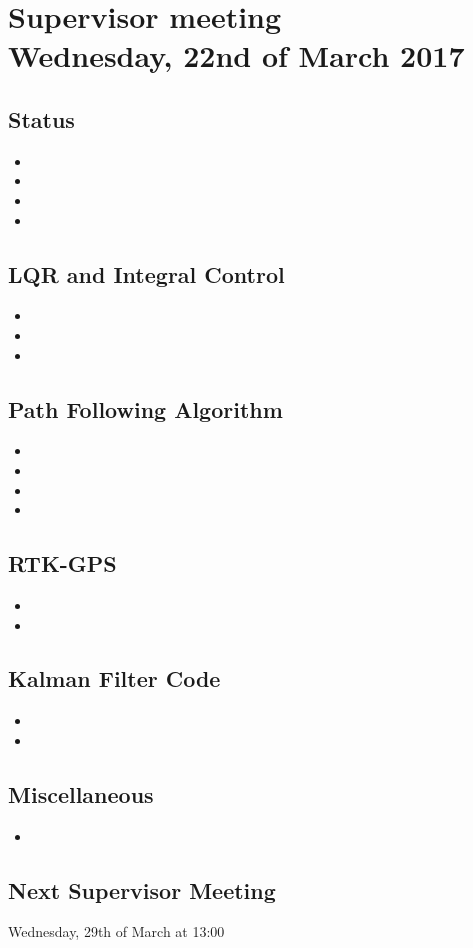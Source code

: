
\renewcommand{\vec}[1]{\boldsymbol{\mathbf{#1}}}

\renewcommand\chaptername{KAPITEL}
\renewcommand\contentsname{Indhold}
\renewcommand\figurename{Figur}
\renewcommand\tablename{Tabel}

\section*{Supervisor meeting\\ \small Wednesday, 22nd of March 2017}
\subsection{Status}
\begin{itemize}
	\item 
	\item
	\item
	\item
\end{itemize}	
\subsection{LQR and Integral Control}
\begin{itemize}
	\item 
	\item 
	\item 
\end{itemize}	
\subsection{Path Following Algorithm}
\begin{itemize}
	\item 
	\item  
	\item 
	\item 
\end{itemize}
\subsection{RTK-GPS}
\begin{itemize}
	\item 
	\item 
\end{itemize}
\subsection{Kalman Filter Code}
\begin{itemize}
	\item 
	\item 
\end{itemize}
\subsection{Miscellaneous}
\begin{itemize}
	\item 
\end{itemize}
\subsection{Next Supervisor Meeting}
Wednesday, 29th of March at 13:00
